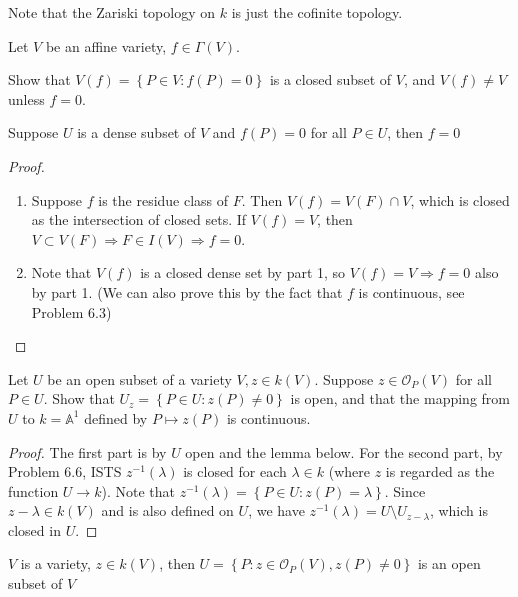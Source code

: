 \documentclass{solution}
\begin{document}
Note that the Zariski topology on $k$ is just the cofinite topology.

\begin{problem}{6.7}
    Let $V$ be an affine variety, $f \in \Gamma(V)$. \begin{inparaenum}
        \item Show that $V(f) = \left\lbrace P \in V: f(P) = 0 \right\rbrace$ is a closed subset of $V$, and $V(f) \ne V$ unless $f = 0$.
        \item Suppose $U$ is a dense subset of $V$ and $f(P) = 0$ for all $P \in U$, then $f = 0$
    \end{inparaenum}
\end{problem}

\begin{proof}
    \begin{enumerate}
        \item Suppose $f$ is the residue class of $F$. Then $V(f) = V(F) \cap V$, which is closed as the intersection of closed sets. If $V(f) = V$, then $V \subset V(F) \Rightarrow F \in I(V) \Rightarrow f = 0$.
        \item Note that $V(f)$ is a closed dense set by part 1, so $V(f) = V \Rightarrow f = 0$ also by part 1. (We can also prove this by the fact that $f$ is continuous, see Problem 6.3)
    \end{enumerate}
\end{proof}

\begin{problem}{6.8}
    Let $U$ be an open subset of a variety $V, z \in k(V)$. Suppose $z \in \mathcal{O}_{P}(V)$ for all $P \in U$. Show that $U_z = \left\lbrace P \in U: z(P) \ne 0 \right\rbrace$ is open, and that the mapping from $U$ to $k = \mathbb{A}^1$ defined by $P \mapsto z(P)$ is continuous.
\end{problem}

\begin{proof}
    The first part is by $U$ open and the lemma below. For the second part, by Problem 6.6, ISTS $z ^{-1}(\lambda)$ is closed for each $\lambda \in k$ (where $z$ is regarded as the function $U \rightarrow k$). Note that $z ^{-1}(\lambda) = \left\lbrace P \in U: z(P) = \lambda \right\rbrace$. Since $z - \lambda \in k(V)$ and is also defined on $U$, we have $z ^{-1}(\lambda) = U \setminus U_{z - \lambda}$, which is closed in $U$.
\end{proof}

\begin{lemma} \label{lem:nonvanishing-open}
    $V$ is a variety, $z \in k(V)$, then $U = \left\lbrace P: z \in \mathcal{O}_{P}(V), z(P) \ne 0 \right\rbrace$ is an open subset of $V$
\end{lemma}
\end{document}
